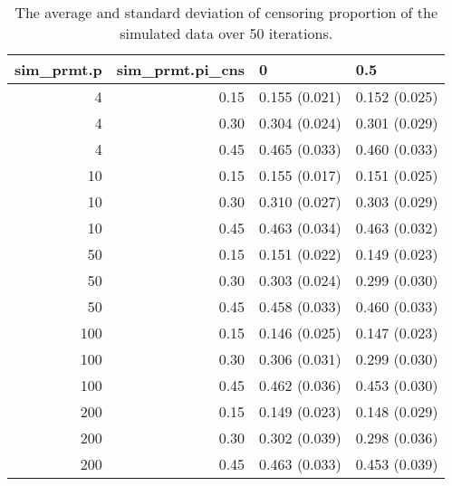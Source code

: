 \begin{table}[ht]
\centering
\begin{tabular}{rrll}
  \hline
sim\_prmt.p & sim\_prmt.pi\_cns & 0 & 0.5 \\ 
  \hline
  4 & 0.15 & 0.155 (0.021) & 0.152 (0.025) \\ 
    4 & 0.30 & 0.304 (0.024) & 0.301 (0.029) \\ 
    4 & 0.45 & 0.465 (0.033) & 0.460 (0.033) \\ 
   10 & 0.15 & 0.155 (0.017) & 0.151 (0.025) \\ 
   10 & 0.30 & 0.310 (0.027) & 0.303 (0.029) \\ 
   10 & 0.45 & 0.463 (0.034) & 0.463 (0.032) \\ 
   50 & 0.15 & 0.151 (0.022) & 0.149 (0.023) \\ 
   50 & 0.30 & 0.303 (0.024) & 0.299 (0.030) \\ 
   50 & 0.45 & 0.458 (0.033) & 0.460 (0.033) \\ 
  100 & 0.15 & 0.146 (0.025) & 0.147 (0.023) \\ 
  100 & 0.30 & 0.306 (0.031) & 0.299 (0.030) \\ 
  100 & 0.45 & 0.462 (0.036) & 0.453 (0.030) \\ 
  200 & 0.15 & 0.149 (0.023) & 0.148 (0.029) \\ 
  200 & 0.30 & 0.302 (0.039) & 0.298 (0.036) \\ 
  200 & 0.45 & 0.463 (0.033) & 0.453 (0.039) \\ 
   \hline
\end{tabular}
\caption{The average and standard deviation of censoring proportion of the simulated data over 50 iterations.} 
\label{tab:sim_cnr_prop}
\end{table}
